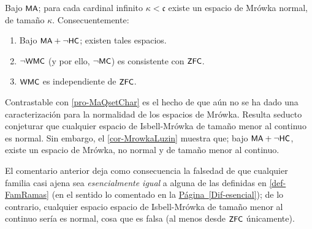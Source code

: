         \begin{corolario}\label{cor-PdmIndependiente}
            Bajo $\text{\textsf{\small MA}}$; para cada cardinal infinito $\kappa<\mathfrak{c}$ existe un espacio de Mrówka normal, de tamaño $\kappa$. Consecuentemente:
            \begin{enumerate}
                \item Bajo $\text{\textsf{\small MA}}+\lnot \text{\textsf{\small HC}}$; existen tales espacios.
                \item $\lnot\text{\textsf{\small WMC}}$ (y por ello, $\lnot\text{\textsf{\small MC}}$) es consistente con $\text{\textsf{\small ZFC}}$.
                \item $\text{\textsf{\small WMC}}$ es independiente de $\text{\textsf{\small ZFC}}$.
            \end{enumerate}
        \end{corolario}

        Contrastable con \ref{pro-MaQsetChar} es el hecho de que aún no se ha dado una caracterización para la normalidad de los espacios de Mrówka. Resulta seducto conjeturar que cualquier espacio de Isbell-Mrówka de tamaño menor al continuo es normal. Sin embargo, el \autoref{cor-MrowkaLuzin} muestra que; bajo $\text{\textsf{\small MA}}+\lnot \text{\textsf{\small HC}}$, existe un espacio de Mrówka, no normal y de tamaño menor al continuo.
        
        El comentario anterior deja como consecuencia la falsedad de que cualquier familia casi ajena sea \textit{esencialmente igual} a alguna de las definidas en \ref{def-FamRamas} (en el sentido lo comentado en la \hyperref[Dif-esencial]{Página~\ref{Dif-esencial}}); de lo contrario, cualquier espacio espacio de Isbell-Mrówka de tamaño menor al continuo sería es normal, cosa que es falsa (al menos desde $\text{\textsf{\small ZFC}}$ únicamente).


        


        
    





